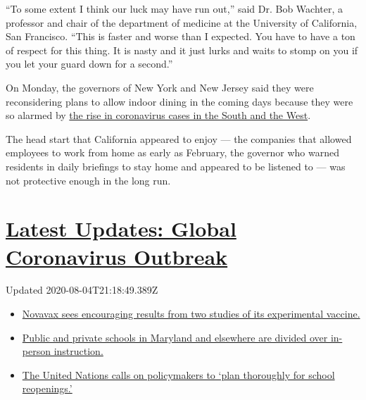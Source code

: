 ``To some extent I think our luck may have run out,'' said Dr. Bob
Wachter, a professor and chair of the department of medicine at the
University of California, San Francisco. ``This is faster and worse than
I expected. You have to have a ton of respect for this thing. It is
nasty and it just lurks and waits to stomp on you if you let your guard
down for a second.''

On Monday, the governors of New York and New Jersey said they were
reconsidering plans to allow indoor dining in the coming days because
they were so alarmed by
\href{https://www.nytimes.com/2020/06/14/us/coronavirus-united-states.html}{the
rise in coronavirus cases in the South and the West}.

The head start that California appeared to enjoy --- the companies that
allowed employees to work from home as early as February, the governor
who warned residents in daily briefings to stay home and appeared to be
listened to --- was not protective enough in the long run.

\hypertarget{latest-updates-global-coronavirus-outbreak}{%
\section{\texorpdfstring{\href{https://www.nytimes.com/2020/08/04/world/coronavirus-cases.html?action=click\&pgtype=Article\&state=default\&region=MAIN_CONTENT_1\&context=storylines_live_updates}{Latest
Updates: Global Coronavirus
Outbreak}}{Latest Updates: Global Coronavirus Outbreak}}\label{latest-updates-global-coronavirus-outbreak}}

Updated 2020-08-04T21:18:49.389Z

\begin{itemize}
\tightlist
\item
  \href{https://www.nytimes.com/2020/08/04/world/coronavirus-cases.html?action=click\&pgtype=Article\&state=default\&region=MAIN_CONTENT_1\&context=storylines_live_updates\#link-1228a480}{Novavax
  sees encouraging results from two studies of its experimental
  vaccine.}
\item
  \href{https://www.nytimes.com/2020/08/04/world/coronavirus-cases.html?action=click\&pgtype=Article\&state=default\&region=MAIN_CONTENT_1\&context=storylines_live_updates\#link-4825b93}{Public
  and private schools in Maryland and elsewhere are divided over
  in-person instruction.}
\item
  \href{https://www.nytimes.com/2020/08/04/world/coronavirus-cases.html?action=click\&pgtype=Article\&state=default\&region=MAIN_CONTENT_1\&context=storylines_live_updates\#link-50f7386d}{The
  United Nations calls on policymakers to `plan thoroughly for school
  reopenings.'}
\end{itemize}

